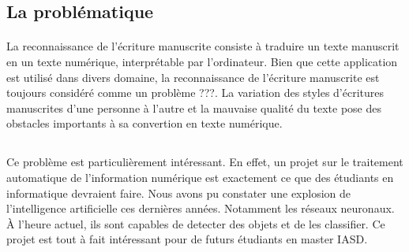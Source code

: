 \documentclass[a4paper]{article}
\begin{document}
		\subsection{La problématique}
			\paragraph{}
				La reconnaissance de l'écriture manuscrite consiste à traduire un texte manuscrit en un texte numérique, interprétable par l'ordinateur. Bien que cette application est utilisé dans divers domaine, la reconnaissance de l'écriture manuscrite est toujours considéré comme un problème ???. La variation des styles d'écritures manuscrites d'une personne à l'autre et la mauvaise qualité du texte pose des obstacles importants à sa convertion en texte numérique.


		\subsection*{}
			Ce problème est particulièrement intéressant. En effet, un projet sur le traitement automatique de l'information numérique est exactement ce que des étudiants en informatique devraient faire. Nous avons pu constater une explosion
			de l'intelligence artificielle ces dernières années. Notamment les réseaux neuronaux. À l'heure actuel, ils sont capables de detecter des objets et de les classifier. Ce projet est tout à fait 
			intéressant pour de futurs étudiants en master IASD.
\end{document}
